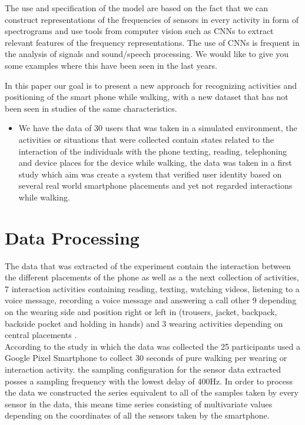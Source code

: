 \documentclass[10pt,halfline,a4paper]{ouparticle}
\begin{document}
\noindent
The use and specification of the model are based on the fact that we can construct representations of the frequencies of sensors in every activity in form of spectrograms and use tools from computer vision such as CNNs to extract relevant features of the frequency representations. The use of CNNs is frequent in the analysis of signals and sound/speech processing. We would like to give you some examples where this have been seen in the last years.


\noindent
In this paper our goal is to present a new approach for recognizing activities and positioning of the smart phone while walking, with a new dataset that has not been seen in studies of the same characteristics. 
\begin{itemize}
	\item We have the data of 30 users that was taken in a simulated environment, the activities or situations that were collected contain states related to the interaction of the individuals with the phone texting, reading, telephoning and device places for the device while walking, the data was taken in a first study \cite{Klieme} which aim was create a system that verified user identity based on several real world smartphone placements and yet not regarded interactions while walking. 
\end{itemize}

\section{Data Processing}

The data that was extracted of the experiment contain the interaction between the different placements of the phone as well as a the next collection of activities, 7 interaction activities containing reading, texting, watching videos, listening to a voice message, recording a voice message and answering a call other 9 depending on the wearing side and position right or left in (trousers, jacket, backpack, backside pocket and holding in hands) and 3 wearing activities depending on central placements \cite{Klieme}. \\

\noindent
According to the study in which the data was collected the 25 participants used a Google Pixel Smartphone to collect 30 seconds of pure walking per wearing or interaction activity. the sampling configuration for the sensor data extracted posses a sampling frequency with the lowest delay of 400Hz.
In order to process the data we constructed the series equivalent to all of the samples taken by every sensor in the data, this means time series consisting of multivariate values depending on the coordinates of all the sensors taken by the smartphone.
\end{document}
